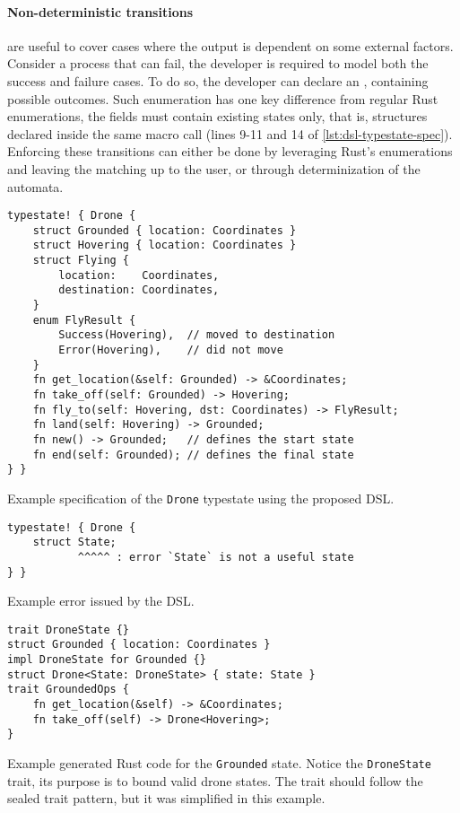 \paragraph{Non-deterministic transitions} are useful to cover cases where the output is dependent on some external factors.
Consider a process that can fail, the developer is required to model both the success and failure cases.
To do so, the developer can declare an , containing possible outcomes.
Such enumeration has one key difference from regular Rust enumerations, the fields must contain existing states only,
that is, structures declared inside the same macro call (lines 9-11 and 14 of \autoref{lst:dsl-typestate-spec}).
Enforcing these transitions can either be done by leveraging Rust's enumerations and leaving the matching up to the user,
or through determinization of the automata.

\begin{listing}
    \centering
    \begin{verbatim}
typestate! { Drone {
    struct Grounded { location: Coordinates }
    struct Hovering { location: Coordinates }
    struct Flying {
        location:    Coordinates,
        destination: Coordinates,
    }
    enum FlyResult {
        Success(Hovering),  // moved to destination
        Error(Hovering),    // did not move
    }
    fn get_location(&self: Grounded) -> &Coordinates;
    fn take_off(self: Grounded) -> Hovering;
    fn fly_to(self: Hovering, dst: Coordinates) -> FlyResult;
    fn land(self: Hovering) -> Grounded;
    fn new() -> Grounded;   // defines the start state
    fn end(self: Grounded); // defines the final state
} }
    \end{verbatim}
    \caption{
        Example specification of the \texttt{Drone} typestate using the proposed DSL.
    }
    \label{lst:dsl-typestate-spec}
\end{listing}

\begin{listing}
    \centering
    \begin{verbatim}
typestate! { Drone {
    struct State;
           ^^^^^ : error `State` is not a useful state
} }
    \end{verbatim}
    \caption{
        Example error issued by the DSL.
    }
    \label{lst:dsl-typestate-error}
\end{listing}

\begin{listing}
    \centering
    \begin{verbatim}
trait DroneState {}
struct Grounded { location: Coordinates }
impl DroneState for Grounded {}
struct Drone<State: DroneState> { state: State }
trait GroundedOps {
    fn get_location(&self) -> &Coordinates;
    fn take_off(self) -> Drone<Hovering>;
}
    \end{verbatim}
    \caption{
        Example generated Rust code for the \texttt{Grounded} state.
        Notice the \texttt{DroneState} trait, its purpose is to bound valid drone states.
        The trait should follow the sealed trait pattern, but it was simplified in this example.
    }
    \label{lst:dsl-typestate-generated}
\end{listing}


